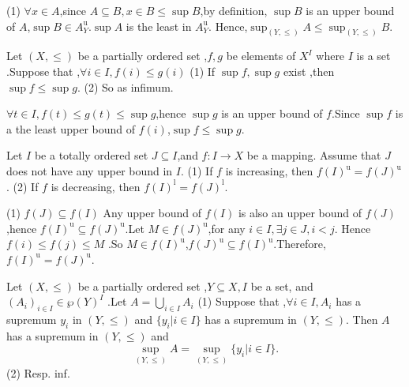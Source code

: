 \documentclass{book}
\numberwithin{equation}{section}
\begin{document}
\begin{proofenv}
    \quad
    \newline
    (1) $\forall x\in A$,since $A\subseteq B,x\in B \le \sup B$,by definition, $\sup B$ is an upper bound of $A$,$\sup B\in A_Y^\mathrm{u}$.$\sup A$ is the least in $A_Y^\mathrm{u}$. Hence,$\sup_{(Y,\le)}A \le \sup_{(Y,\le)}B$.
\end{proofenv}
\begin{propositionenv}\label{proposition4.5.3}
    Let $(X,\le )$ be a partially ordered set ,$f,g$ be elements of $X^I$ where $I$ is a set .Suppose that ,$\forall i\in  I ,f(i)\le g(i)$
 \newline
 (1) If $\sup f,\sup g$ exist ,then $\sup f\le\sup g$.
 \newline
 (2) So as infimum.
\end{propositionenv}
\begin{proofenv}
    $\forall t\in I,f(t)\le g(t)\le \sup g$,hence $\sup g$ is an upper bound of $f$.Since $\sup f $ is a the least upper bound of $f(i)$,$\sup f\le\sup g$.
\end{proofenv}
\begin{propositionenv}
    Let $I$ be a totally ordered set $J\subseteq I $,and $f:I\rightarrow X $ be a mapping. Assume that $J$ does not have any upper bound in $I$.
    \newline 
    (1) If $f$ is increasing, then $f(I)^\mathrm{u}=f(J)^\mathrm{u}$.
    \newline
    (2) If $f$ is decreasing, then $f(I)^\mathrm{l}=f(J)^\mathrm{l}$.
\end{propositionenv}
\begin{proofenv}
    \quad 
    \newline
    (1) $f(J)\subseteq f(I)$ Any upper bound of $f(I)$ is also an upper bound of $f(J)$,hence $f(I)^\mathrm{u}\subseteq f(J)^\mathrm{u}$.Let $M\in f(J)^\mathrm{u}$,for any $i\in I,\exists j\in J,i<j$. Hence $f(i)\le f(j)\le M$ .So $M\in f(I)^\mathrm{u}$,$f(J)^\mathrm{u}\subseteq f(I)^\mathrm{u}$.Therefore,$f(I)^\mathrm{u}=f(J)^\mathrm{u}$.
\end{proofenv}
\begin{propositionenv}
    Let $(X,\le)$ be a partially ordered set ,$Y\subseteq X,I$ be a set, and $(A_i)_{i\in I}\in \wp (Y)^I$ .Let $A=\bigcup _{i\in I}A_i$
    \newline
    (1) Suppose that ,$\forall i \in I,A_i$ has a supremum $y_i$ in $(Y,\le)$ and $\{y_i|i\in I\}$ has a supremum in $(Y,\le)$. Then $A$ has a supremum in $(Y,\le )$ and $$\sup_{(Y,\le)}A=\sup_{(Y,\le)}\{y_i|i\in I\}.$$
    \newline
    (2) Resp. inf.
\end{propositionenv}
\end{document}

